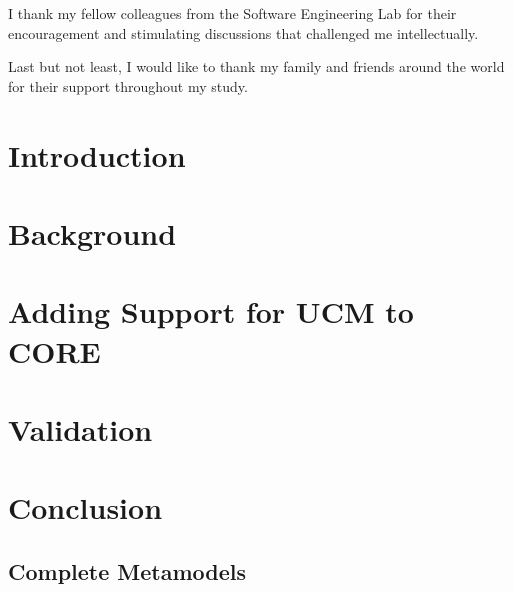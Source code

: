 \documentclass[12pt,letterpaper]{report}
\begin{document}
	I thank my fellow colleagues from the Software Engineering Lab for their encouragement and stimulating discussions that challenged me intellectually.
	
	Last but not least, I would like to thank my family and friends around the world for their support throughout my study.
	
	\renewcommand{\contentsname}{Table of Contents}
	\tableofcontents
	\listoffigures
	\listofalgorithms
	
	\clearpage
	
	\chapter{Introduction}
	
	
	\chapter{Background} \label{ch:2}
	
	
	\chapter{Adding Support for UCM to CORE} \label{ch:3}
	
	
	\chapter{Validation} \label{ch:4}
	
	
	\chapter{Conclusion} \label{ch:5}
	
	
	\renewcommand\bibname{References}
	\printbibliography[heading=bibintoc]
	
	\begin{appendices}
		
		\chapter{Complete Metamodels} \label{ch:A}
		
		
	\end{appendices}
	
\end{document}
